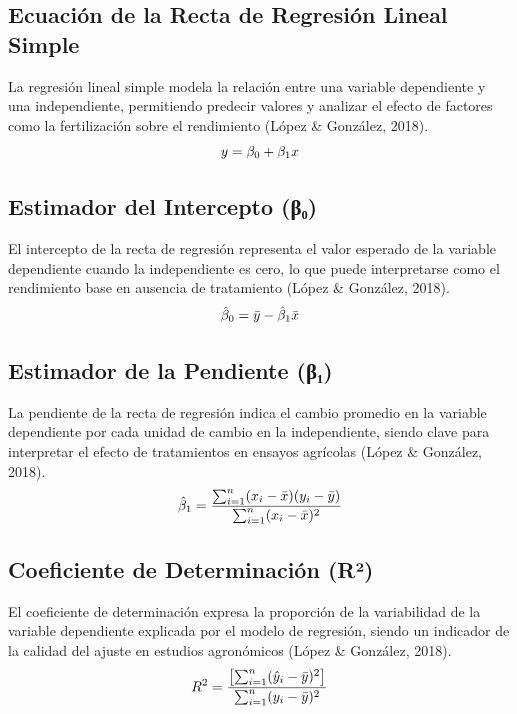 \documentclass[
  spanish,
  letterpaper,
]{book}
\begin{document}
\subsection{Ecuación de la Recta de Regresión Lineal
Simple}\label{ecuaciuxf3n-de-la-recta-de-regresiuxf3n-lineal-simple}

La regresión lineal simple modela la relación entre una variable
dependiente y una independiente, permitiendo predecir valores y analizar
el efecto de factores como la fertilización sobre el rendimiento (López
\& González, 2018). \[
\huge
y = \beta_0 + \beta_1 x
\]

\subsection{Estimador del Intercepto
(β₀)}\label{estimador-del-intercepto-ux3b2ux2080}

El intercepto de la recta de regresión representa el valor esperado de
la variable dependiente cuando la independiente es cero, lo que puede
interpretarse como el rendimiento base en ausencia de tratamiento (López
\& González, 2018). \[
\huge
\hat{\beta}_0 = \bar{y} - \hat{\beta}_1 \bar{x}
\]

\subsection{Estimador de la Pendiente
(β₁)}\label{estimador-de-la-pendiente-ux3b2ux2081}

La pendiente de la recta de regresión indica el cambio promedio en la
variable dependiente por cada unidad de cambio en la independiente,
siendo clave para interpretar el efecto de tratamientos en ensayos
agrícolas (López \& González, 2018). \[
\huge
\hat{\beta}_1 = \frac{\sum_{i=1}^{n} (x_i - \bar{x})(y_i - \bar{y})}{\sum_{i=1}^{n} (x_i - \bar{x})^2}
\]

\subsection{Coeficiente de Determinación
(R²)}\label{coeficiente-de-determinaciuxf3n-ruxb2}

El coeficiente de determinación expresa la proporción de la variabilidad
de la variable dependiente explicada por el modelo de regresión, siendo
un indicador de la calidad del ajuste en estudios agronómicos (López \&
González, 2018). \[
\huge
R^2 = \frac{\left[ \sum_{i=1}^{n} (\hat{y}_i - \bar{y})^2 \right]}{\sum_{i=1}^{n} (y_i - \bar{y})^2}
\]
\end{document}
